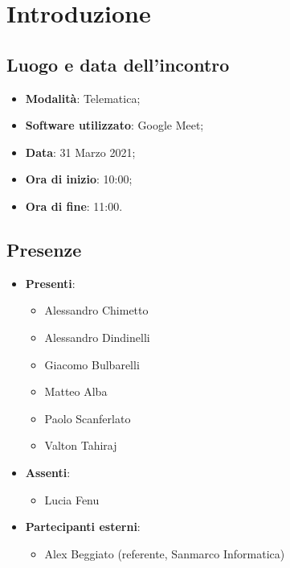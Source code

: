 \documentclass[]{article}
\begin{document}
	

	\newpage


	\section{Introduzione}
	\subsection{Luogo e data dell'incontro}
	\begin{itemize}
		\item \textbf{Modalità}: Telematica;
		\item \textbf{Software utilizzato}: Google Meet;
		\item \textbf{Data}: 31 Marzo 2021;
		\item \textbf{Ora di inizio}: 10:00;
		\item \textbf{Ora di fine}: 11:00.
	\end{itemize}

	\subsection{Presenze}
	\begin{itemize}
		\item \textbf{Presenti}:
		\begin{itemize}
			\item Alessandro Chimetto
			\item Alessandro Dindinelli
			\item Giacomo Bulbarelli
			\item Matteo Alba
			\item Paolo Scanferlato
			\item Valton Tahiraj

		\end{itemize}
		\item \textbf{Assenti}:
		\begin{itemize}
			\item Lucia Fenu

		\end{itemize}
		\item \textbf{Partecipanti esterni}:
		\begin{itemize}
			\item Alex Beggiato (referente, Sanmarco Informatica)
		\end{itemize}
	\end{itemize}
\end{document}
